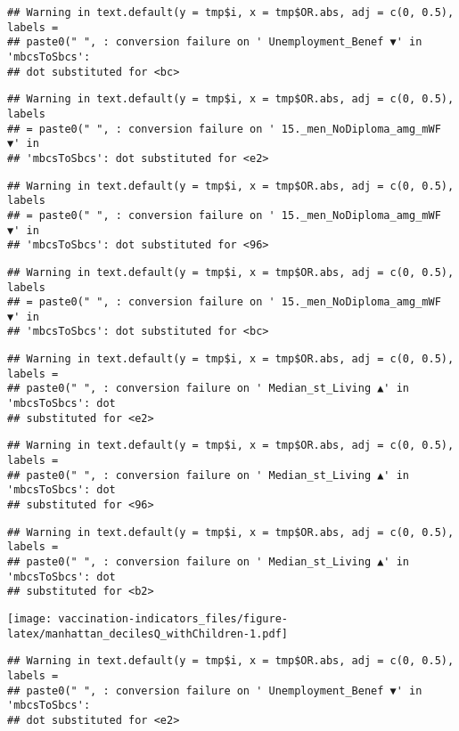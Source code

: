 \documentclass[
]{article}
\begin{document}
\begin{verbatim}
## Warning in text.default(y = tmp$i, x = tmp$OR.abs, adj = c(0, 0.5), labels =
## paste0(" ", : conversion failure on ' Unemployment_Benef ▼' in 'mbcsToSbcs':
## dot substituted for <bc>
\end{verbatim}

\begin{verbatim}
## Warning in text.default(y = tmp$i, x = tmp$OR.abs, adj = c(0, 0.5), labels
## = paste0(" ", : conversion failure on ' 15._men_NoDiploma_amg_mWF ▼' in
## 'mbcsToSbcs': dot substituted for <e2>
\end{verbatim}

\begin{verbatim}
## Warning in text.default(y = tmp$i, x = tmp$OR.abs, adj = c(0, 0.5), labels
## = paste0(" ", : conversion failure on ' 15._men_NoDiploma_amg_mWF ▼' in
## 'mbcsToSbcs': dot substituted for <96>
\end{verbatim}

\begin{verbatim}
## Warning in text.default(y = tmp$i, x = tmp$OR.abs, adj = c(0, 0.5), labels
## = paste0(" ", : conversion failure on ' 15._men_NoDiploma_amg_mWF ▼' in
## 'mbcsToSbcs': dot substituted for <bc>
\end{verbatim}

\begin{verbatim}
## Warning in text.default(y = tmp$i, x = tmp$OR.abs, adj = c(0, 0.5), labels =
## paste0(" ", : conversion failure on ' Median_st_Living ▲' in 'mbcsToSbcs': dot
## substituted for <e2>
\end{verbatim}

\begin{verbatim}
## Warning in text.default(y = tmp$i, x = tmp$OR.abs, adj = c(0, 0.5), labels =
## paste0(" ", : conversion failure on ' Median_st_Living ▲' in 'mbcsToSbcs': dot
## substituted for <96>
\end{verbatim}

\begin{verbatim}
## Warning in text.default(y = tmp$i, x = tmp$OR.abs, adj = c(0, 0.5), labels =
## paste0(" ", : conversion failure on ' Median_st_Living ▲' in 'mbcsToSbcs': dot
## substituted for <b2>
\end{verbatim}

\texttt{[image: vaccination-indicators\_files/figure-latex/manhattan\_decilesQ\_withChildren-1.pdf]}

\begin{verbatim}
## Warning in text.default(y = tmp$i, x = tmp$OR.abs, adj = c(0, 0.5), labels =
## paste0(" ", : conversion failure on ' Unemployment_Benef ▼' in 'mbcsToSbcs':
## dot substituted for <e2>
\end{verbatim}
\end{document}
